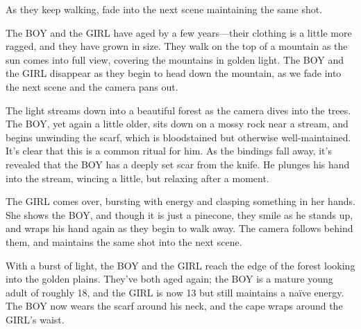 \documentclass{screenplay}
\begin{document}
As they keep walking, fade into the next scene maintaining the same shot.

The BOY and the GIRL have aged by a few years---their clothing is a little more ragged, and they have grown in size.
They walk on the top of a mountain as the sun comes into full view, covering the mountains in golden light.
The BOY and the GIRL disappear as they begin to head down the mountain, as we fade into the next scene and the camera pans out.

The light streams down into a beautiful forest as the camera dives into the trees.
The BOY, yet again a little older, sits down on a mossy rock near a stream, and begins unwinding the scarf, which is bloodstained but otherwise well-maintained.
It's clear that this is a common ritual for him.
As the bindings fall away, it's revealed that the BOY has a deeply set scar from the knife.
He plunges his hand into the stream, wincing a little, but relaxing after a moment.

The GIRL comes over, bursting with energy and clasping something in her hands.
She shows the BOY, and though it is just a pinecone, they smile as he stands up, and wraps his hand again as they begin to walk away.
The camera follows behind them, and maintains the same shot into the next scene.

With a burst of light, the BOY and the GIRL reach the edge of the forest looking into the golden plains.
They've both aged again; the BOY is a mature young adult of roughly 18, and the GIRL is now 13 but still maintains a na{\"i}ve energy.
The BOY now wears the scarf around his neck, and the cape wraps around the GIRL's waist.

\end{document}
